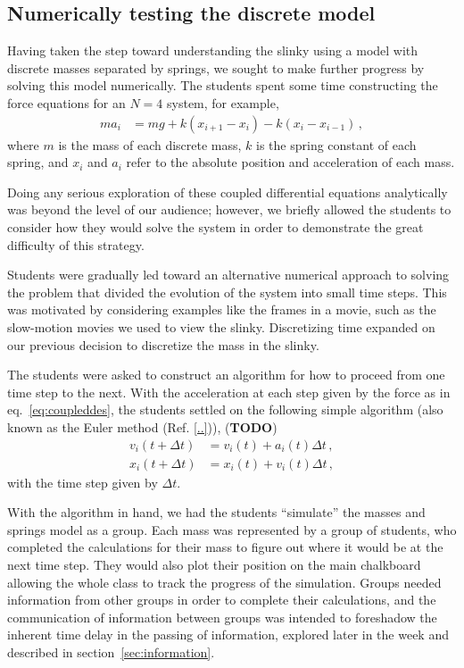 \documentclass[prb,preprint,superscriptaddress]{revtex4-1}
\newcommand{\TODO}[1]{\marginpar{\raggedright\scriptsize\textbf{TODO:} #1} (\textbf{TODO})}
\newcommand{\eq}[1]{eq.~\eqref{eq:#1}}
\renewcommand{\sec}[1]{section~\ref{sec:#1}}
\newcommand{\nn}{\nonumber}
\begin{document}
\subsection{Numerically testing the discrete model}
\label{subsec:forcesnumeric}

Having taken the step toward understanding the slinky using a model with
discrete masses separated by springs, we sought to make further progress by
solving this model numerically. The students spent some time constructing the
force equations for an $N=4$ system, for example,
\begin{align} \label{eq:coupleddes}
ma_i &= mg + k(x_{i+1} - x_i) - k(x_i - x_{i-1})
\,,\end{align}
where $m$ is the mass of each discrete mass, $k$ is the spring constant of each
spring, and $x_i$ and $a_i$ refer to the absolute position and acceleration of each mass.

Doing any serious exploration of these coupled differential equations
analytically was beyond the level of our audience; however, we briefly allowed
the students to consider how they would solve the system in order to demonstrate
the great difficulty of this strategy.

Students were gradually led toward an alternative numerical approach to solving
the problem that divided the evolution of the system into small time
steps. This was motivated by considering examples like the frames in a
movie, such as the slow-motion movies we used to view the slinky. Discretizing time expanded on our previous decision to discretize the mass
in the slinky.

The students were asked to construct an algorithm
for how to proceed from one time step to the next. With the acceleration at each
step given by the force as in \eq{coupleddes}, the students settled on the
following simple algorithm (also known as the Euler method (Ref. \ref{..})),
\TODO{find textbook reference for Euler method}
\begin{align} \label{eq:algorithm}
v_i(t+\Delta t) &= v_i(t) + a_i(t)\Delta t
\,,\nn\\
x_i(t+\Delta t) &= x_i(t) + v_i(t)\Delta t
\,,\end{align}
with the time step given by $\Delta t$.

With the algorithm in hand, we had the students ``simulate'' the masses and
springs model as a group. Each mass was represented by a group of 
students, who completed the calculations for their mass to figure out where it would be
at the next time step.
They would also plot their position on the main chalkboard allowing the whole class to track
the progress of the simulation.
Groups needed information from other groups in order to complete their calculations,
and the communication of information between groups was intended 
to foreshadow the inherent time delay in the passing of information, explored later in
the week and described in \sec{information}.
\end{document}
